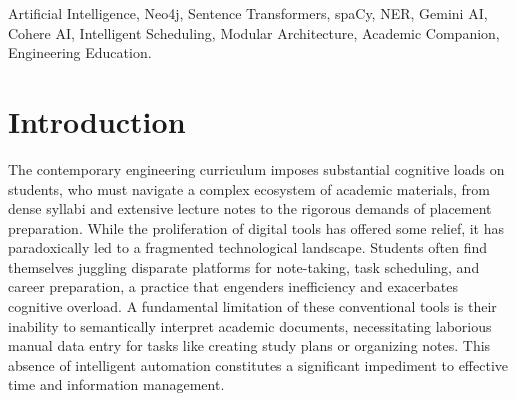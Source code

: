 \documentclass[conference]{IEEEtran}
\begin{document}
\begin{abstract}
This paper introduces TrackEneer, an AI-powered academic companion designed to assist engineering students in managing their studies, notes, placement preparation, and personalized academic guidance. The system implements a comprehensive multi-module architecture featuring: (1) an intelligent scheduling system utilizing Neo4j graph database and sentence-transformers for dynamic task management, (2) a study module for organizing academic materials with semantic search capabilities using all-mpnet-base-v2 embeddings and spaCy NER, (3) an AI-powered placement preparation module leveraging Google's Gemini AI for company research and interview preparation, (4) a personalized insights module using Cohere AI to generate year and branch-specific academic guidance, and (5) a real-time notification service with WebSocket and Web Push integration. The platform employs a modular architecture with Next.js frontend and FastAPI backend, ChromaDB for vector storage, and MongoDB for document persistence. This paper details the design, architecture, implementation, and evaluation of TrackEneer, demonstrating its effectiveness in enhancing academic productivity through intelligent automation and personalized recommendations.
\end{abstract}

\begin{IEEEkeywords}
Artificial Intelligence, Neo4j, Sentence Transformers, spaCy, NER, Gemini AI, Cohere AI, Intelligent Scheduling, Modular Architecture, Academic Companion, Engineering Education.
\end{IEEEkeywords}

\section{Introduction}
The contemporary engineering curriculum imposes substantial cognitive loads on students, who must navigate a complex ecosystem of academic materials, from dense syllabi and extensive lecture notes to the rigorous demands of placement preparation. While the proliferation of digital tools has offered some relief, it has paradoxically led to a fragmented technological landscape. Students often find themselves juggling disparate platforms for note-taking, task scheduling, and career preparation, a practice that engenders inefficiency and exacerbates cognitive overload. A fundamental limitation of these conventional tools is their inability to semantically interpret academic documents, necessitating laborious manual data entry for tasks like creating study plans or organizing notes. This absence of intelligent automation constitutes a significant impediment to effective time and information management.
\end{document}
